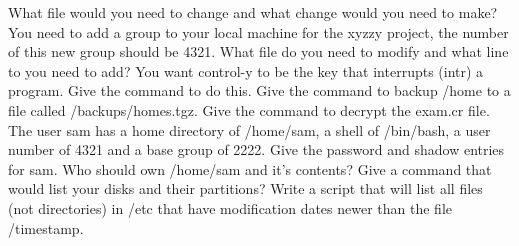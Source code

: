 What file would you need to change and what change would you need
to make?
\vskip 1.0in
You need to add a group to your local machine for the xyzzy project,
the number of this new group should be 4321.
What file do you need to modify and what line to you need to add?
\vskip 0.9in
\vfill\eject
\ques
You want {\ltt{}control-y} to be the key that interrupts ({\ltt{}intr})
a program.
Give the command to do this.
\vskip 0.4in
Give the command to backup /home to a file called {\ltt{}/backups/homes.tgz}.
\vskip 0.4in
Give the command to decrypt the {\ltt{}exam.cr} file.
\vskip 0.4in
\ques
The user {\ltt{}sam} has  a home directory of {\ltt{}/home/sam},
a shell of {\ltt{}/bin/bash}, a user number of {\ltt{}4321}
and a base group of {\ltt{}2222}.
Give the password and shadow entries for {\ltt{}sam}.
\vskip 0.8in
Who should own {\ltt{}/home/sam} and it's contents?
\vskip 0.4in
\ques
Give a command that would list your disks and their partitions?
\vskip 0.4in
Write a script that will list all files (not directories) in {\ltt{}/etc} 
that have modification dates newer than the file {\ltt{}/timestamp}.
\vskip 1.1in
\bye
